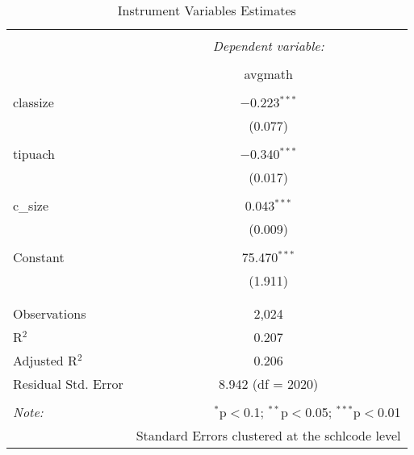 
\begin{table}[!htbp] \centering 
  \caption{Instrument Variables Estimates} 
  \label{} 
\begin{tabular}{@{\extracolsep{5pt}}lc} 
\\[-1.8ex]\hline 
\hline \\[-1.8ex] 
 & \multicolumn{1}{c}{\textit{Dependent variable:}} \\ 
\cline{2-2} 
\\[-1.8ex] & avgmath \\ 
\hline \\[-1.8ex] 
 classize & $-$0.223$^{***}$ \\ 
  & (0.077) \\ 
  & \\ 
 tipuach & $-$0.340$^{***}$ \\ 
  & (0.017) \\ 
  & \\ 
 c\_size & 0.043$^{***}$ \\ 
  & (0.009) \\ 
  & \\ 
 Constant & 75.470$^{***}$ \\ 
  & (1.911) \\ 
  & \\ 
\hline \\[-1.8ex] 
Observations & 2,024 \\ 
R$^{2}$ & 0.207 \\ 
Adjusted R$^{2}$ & 0.206 \\ 
Residual Std. Error & 8.942 (df = 2020) \\ 
\hline 
\hline \\[-1.8ex] 
\textit{Note:}  & \multicolumn{1}{r}{$^{*}$p$<$0.1; $^{**}$p$<$0.05; $^{***}$p$<$0.01} \\ 
 & \multicolumn{1}{r}{Standard Errors clustered at the schlcode level} \\ 
\end{tabular} 
\end{table} 
